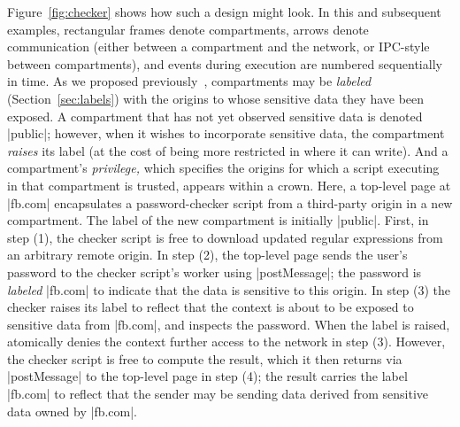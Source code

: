 Figure~\ref{fig:checker} shows how such a design might look. In this
and subsequent examples, rectangular frames denote compartments,
arrows denote communication (either between a compartment and the
network, or IPC-style between compartments), and events during
execution are numbered sequentially in time. As we proposed
previously~\cite{yang:2013:towards}, compartments may be
\emph{labeled} (Section~\ref{sec:labels}) with the origins to whose
sensitive data they have been exposed. A compartment that has not yet
observed sensitive data is denoted \js|public|; however, when it
wishes to incorporate sensitive data, the compartment \emph{raises}
its label (at the cost of being more restricted in where it can
write). And a compartment's \emph{privilege,} which specifies the
origins for which a script executing in that compartment is trusted,
appears within a crown. Here, a top-level page at \js|fb.com|
encapsulates a password-checker script from a third-party origin in a
new compartment. The label of the new compartment is initially
\js|public|. 
First, in step (1), the checker script is free to
download updated regular expressions from an arbitrary remote
origin. In step (2), the top-level page sends the user's password to
the checker script's worker using \js|postMessage|; the password is
\emph{labeled} \js|fb.com| to indicate that the data is sensitive to
this origin.
%
%
In step (3) the checker raises its label to reflect that the context
is about to be exposed to sensitive data from \js|fb.com|, and
inspects the password.
%
When the label is raised, \sys{} atomically denies the context further
access to the network in step (3).
%
However, the checker script is free to compute the result, which
it then returns via \js|postMessage| to the top-level page in step (4); the
result carries the label \js|fb.com| to reflect that the sender may be
sending data derived from sensitive data owned by \js|fb.com|.

